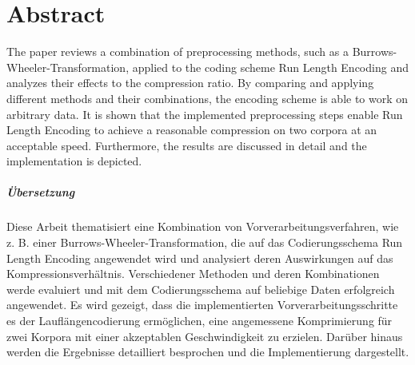 \chapter*{Abstract}
The paper reviews a combination of preprocessing methods, such as a Burrows-Wheeler-Transformation, applied to the coding scheme Run Length Encoding and analyzes their effects to the compression ratio. By comparing and applying different methods and their combinations, the encoding scheme is able to work on arbitrary data. It is shown that the implemented preprocessing steps enable Run Length Encoding to achieve a reasonable compression on two corpora at an acceptable speed. Furthermore, the results are discussed in detail and the implementation is depicted.

\paragraph{Übersetzung}
Diese Arbeit thematisiert eine Kombination von Vorverarbeitungsverfahren, wie z. B. einer Burrows-Wheeler-Transformation, die auf das Codierungsschema Run Length Encoding angewendet wird und analysiert deren Auswirkungen auf das Kompressionsverhältnis. Verschiedener Methoden und deren Kombinationen werde evaluiert und  mit dem Codierungsschema auf beliebige Daten erfolgreich angewendet. Es wird gezeigt, dass die implementierten Vorverarbeitungsschritte es der Lauflängencodierung ermöglichen, eine angemessene Komprimierung für zwei Korpora mit einer akzeptablen Geschwindigkeit zu erzielen. Darüber hinaus werden die Ergebnisse detailliert besprochen und die Implementierung dargestellt.